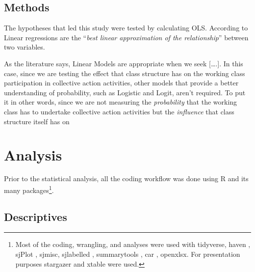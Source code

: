 \documentclass[12pt]{article}
\begin{document}
\hypertarget{methods}{%
\subsection{Methods}\label{methods}}

\citep{huntington-kleinEffectIntroductionResearch2022}

The hypotheses that led this study were tested by calculating OLS.
According to Linear regressions are the ``\emph{best linear
approximation of the relationship}'' between two variables.

As the literature says, Linear Models are appropriate when we seek
{[}\ldots.{]}. In this case, since we are testing the effect that class
structure has on the working class participation in collective action
activities, other models that provide a better understanding of
probability, such as Logistic and Logit, aren't required. To put it in
other words, since we are not measuring the \emph{probability} that the
working class has to undertake collective action activities but the
\emph{influence} that class structure itself has on

\hypertarget{analysis}{%
\section{Analysis}\label{analysis}}

Prior to the statistical analysis, all the coding workflow was done
using R and its many packages\footnote{Most of the coding, wrangling,
  and analyses were used with tidyverse\citep{tidyverse}, haven
  \citep{haven}, sjPlot \citep{sjPlot}, sjmisc\citep{sjmisc}, sjlabelled
  \citep{sjlabelled}, summarytools \citep{summarytools}, car
  \citep{car}, openxlsx\citep{openxlsx}. For presentation purposes
  stargazer \citep{stargazer} and xtable \citep{xtable} were used.}.

\hypertarget{descriptives}{%
\subsection{Descriptives}\label{descriptives}}
\end{document}
